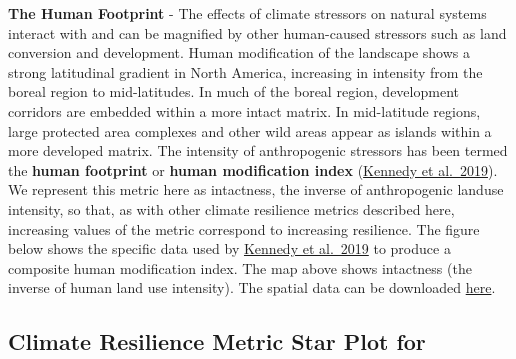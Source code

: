 \documentclass[
]{article}
\begin{document}
\textbf{The Human Footprint} - The effects of climate stressors on
natural systems interact with and can be magnified by other human-caused
stressors such as land conversion and development. Human modification of
the landscape shows a strong latitudinal gradient in North America,
increasing in intensity from the boreal region to mid-latitudes. In much
of the boreal region, development corridors are embedded within a more
intact matrix. In mid-latitude regions, large protected area complexes
and other wild areas appear as islands within a more developed matrix.
The intensity of anthropogenic stressors has been termed the
\textbf{human footprint} or \textbf{human modification index}
(\href{https://onlinelibrary.wiley.com/doi/abs/10.1111/gcb.14549}{Kennedy
et al.~2019}). We represent this metric here as intactness, the inverse
of anthropogenic landuse intensity, so that, as with other climate
resilience metrics described here, increasing values of the metric
correspond to increasing resilience. The figure below shows the specific
data used by
\href{https://onlinelibrary.wiley.com/doi/abs/10.1111/gcb.14549}{Kennedy
et al.~2019} to produce a composite human modification index. The map
above shows intactness (the inverse of human land use intensity). The
spatial data can be downloaded
\href{https://figshare.com/articles/Global_Human_Modification/7283087}{here}.

\pagebreak

\hypertarget{climate-resilience-metric-star-plot-for}{%
\subsection{Climate Resilience Metric Star Plot
for}\label{climate-resilience-metric-star-plot-for}}
\end{document}
